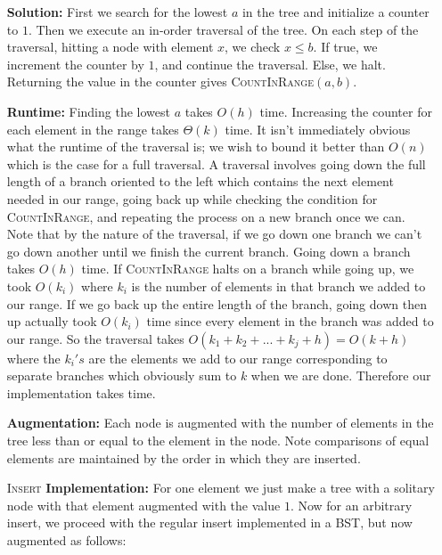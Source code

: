 \documentclass[12pt,twoside]{article}
\begin{document}
\begin{problems}
\begin{problemparts}
\begin{itemize}
\end{itemize}
\end{problemparts}
\problem
\begin{problemparts}
\problempart 
\begin{itemize}
\item [\textbf{Solution:}] First we search for the lowest $a$ in the tree and initialize a counter to $1$. Then we execute an in-order traversal of the tree. On each step of the traversal, hitting a node with element $x$, we check $x\leq b$. If true, we increment the counter by $1$, and continue the traversal. Else,  we halt. Returning the value in the counter gives \textsc{CountInRange}$(a,b)$.
\item [\textbf{Runtime:} ] Finding the lowest $a$ takes $O(h)$ time. Increasing the counter for each element in the range takes $\Theta(k)$ time. It isn't immediately obvious what the runtime of the traversal is; we wish to bound it better than $O(n)$ which is the case for a full traversal. A traversal involves going down the full length of a branch oriented to the left which contains the next element needed in our range, going back up while checking the condition for \textsc{CountInRange}, and repeating the process on a new branch once we can. Note that by the nature of the traversal, if we go down one branch we can't go down another until we finish the current branch. Going down a branch takes $O(h)$ time. If \textsc{CountInRange} halts on a branch while going up, we took $O(k_i)$ where $k_i$ is the number of elements in that branch we added to our range. If we go back up the entire length of the branch, going down then up actually took $O(k_i)$ time since every element in the branch was added to our range. So the traversal takes $O(k_1+k_2+...+k_j+h)=O(k+h)$ where the $k_i's$ are the elements we add to our range corresponding to separate branches which obviously sum to $k$ when we are done. Therefore our implementation takes  time.
\end{itemize}
\problempart 
\begin{itemize}
\item [\textbf{Augmentation:}] Each node is augmented with the number of elements in the tree less than or equal to the element in the node. Note comparisons of equal elements are maintained by the order in which they are inserted.
\item [\textsc{Insert}\textbf{ Implementation:}] For one element we just make a tree with a solitary node with that element augmented with the value $1$. Now for an arbitrary insert, we proceed with the regular insert implemented in a BST, but now augmented as follows:

\end{itemize}
\end{problemparts}
\end{problems}
\end{document}
